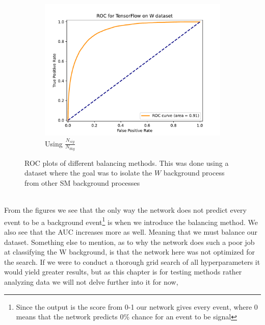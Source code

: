\documentclass[12pt, a4paper]{book}
\begin{document}
\begin{figure}[!ht]
\begin{subfigure}[b]{0.49\textwidth}
         \centering
         \includegraphics[width=1\textwidth]{Balanced/ROC.pdf}
         \caption{Using $\frac{N_{sig}}{N_{bkg}}$}\label{fig:WROCW}
      \end{subfigure}
      \caption[ROC plots for different balancing methods on NN]{ROC plots of different balancing methods. 
      This was done using a dataset where the goal was to isolate the $W$ background process from other SM background processes}\label{fig:WROC}
\end{figure}
\\From the figures we see that the only way the network does not predict every event to be a background event\footnote{Since the output is the score from 0-1 our network gives every event, where 0 means that the network predicts 0\% chance for an event to be signal} is when we introduce the balancing method. We also see that the AUC increases more as well. Meaning that we must balance our dataset. 
Something else to mention, as to why the network does such a poor job at classifying the W background, is that the network here was not optimized for the search. If we were to conduct a thorough grid search of all hyperparameters it would yield greater results, but as this chapter is for testing methods rather analyzing data we will not delve further into it for now,

\clearpage
\end{document}
